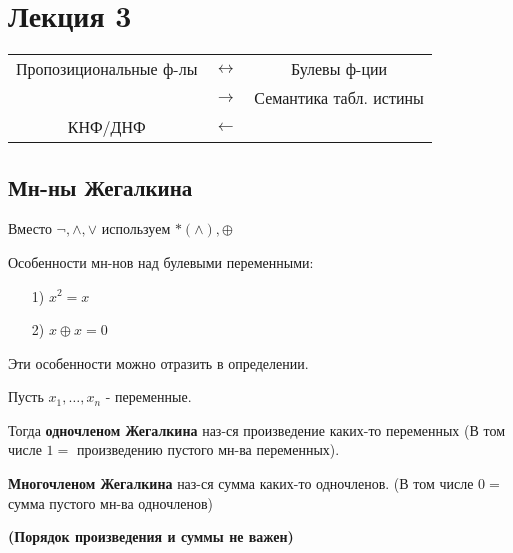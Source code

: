 \section{Лекция 3}

\begin{center}
\begin{tabular}{ |c|c|c| } 
 \hline
 Пропозициональные ф-лы & $\leftrightarrow$ & Булевы ф-ции \\
                        & $\rightarrow$ & Семантика табл. истины \\
 КНФ/ДНФ                & $\leftarrow$ &  \\
 \hline
\end{tabular}
\end{center}

\subsection{Мн-ны Жегалкина}
Вместо $\neg, \land, \lor$ используем $*(\land), \oplus$

Особенности мн-нов над булевыми переменными:
\begin{itemize}
  \item [1) ] $x^{2} = x$ 
  \item [2) ] $x \oplus x = 0$
\end{itemize}

Эти особенности можно отразить в определении.

\begin{definition}
Пусть $x_1, \ldots , x_n$ - переменные.

Тогда \textbf{одночленом Жегалкина} наз-ся произведение каких-то переменных (В том числе $1 = $ произведению пустого мн-ва переменных).

\textbf{Многочленом Жегалкина} наз-ся сумма каких-то одночленов. (В том числе $0 = $ сумма пустого мн-ва одночленов)

\textbf{(Порядок произведения и суммы не важен)}
\end{definition}

